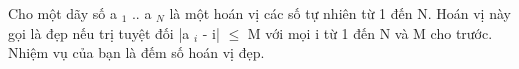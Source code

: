 Cho một dãy số a   $_    1   $   .. a   $_    N   $   là một hoán vị các số tự nhiên từ 1 đến N. Hoán vị này gọi là đẹp nếu trị tuyệt đối |a   $_    i   $   - i|  $\le$  M với mọi i từ 1 đến N và M cho trước. Nhiệm vụ của bạn là đếm số hoán vị đẹp.  

\